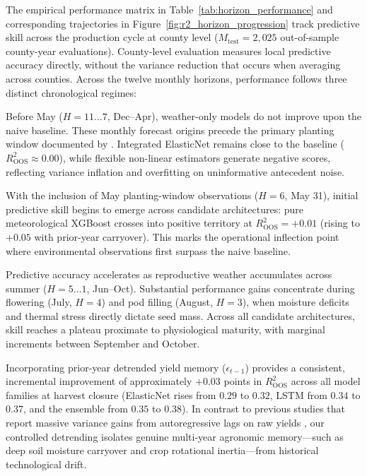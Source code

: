 

The empirical performance matrix in Table~\ref{tab:horizon_performance} and corresponding trajectories in Figure~\ref{fig:r2_horizon_progression} track predictive skill across the production cycle at county level ($M_{\text{test}} = 2{,}025$ out-of-sample county-year evaluations). County-level evaluation measures local predictive accuracy directly, without the variance reduction that occurs when averaging across counties. Across the twelve monthly horizons, performance follows three distinct chronological regimes:

Before May ($H = 11 \dots 7$, Dec--Apr), weather-only models do not improve upon the naive baseline. These monthly forecast origins precede the primary planting window documented by \citet{Hoffman2020}. Integrated ElasticNet remains close to the baseline ($R^2_{\text{OOS}} \approx 0.00$), while flexible non-linear estimators generate negative scores, reflecting variance inflation and overfitting on uninformative antecedent noise.

With the inclusion of May planting-window observations ($H = 6$, May 31), initial predictive skill begins to emerge across candidate architectures: pure meteorological XGBoost crosses into positive territory at $R^2_{\text{OOS}} = +0.01$ (rising to $+0.05$ with prior-year carryover). This marks the operational inflection point where environmental observations first surpass the naive baseline.

Predictive accuracy accelerates as reproductive weather accumulates across summer ($H = 5 \dots 1$, Jun--Oct). Substantial performance gains concentrate during flowering (July, $H=4$) and pod filling (August, $H=3$), when moisture deficits and thermal stress directly dictate seed mass. Across all candidate architectures, skill reaches a plateau proximate to physiological maturity, with marginal increments between September and October.

Incorporating prior-year detrended yield memory ($\epsilon_{t-1}$) provides a consistent, incremental improvement of approximately $+0.03$ points in $R^2_{\text{OOS}}$ across all model families at harvest closure (ElasticNet rises from $0.29$ to $0.32$, LSTM from $0.34$ to $0.37$, and the ensemble from $0.35$ to $0.38$). In contrast to previous studies that report massive variance gains from autoregressive lags on raw yields \citep{ChenZhang2026}, our controlled detrending isolates genuine multi-year agronomic memory---such as deep soil moisture carryover and crop rotational inertia---from historical technological drift.

